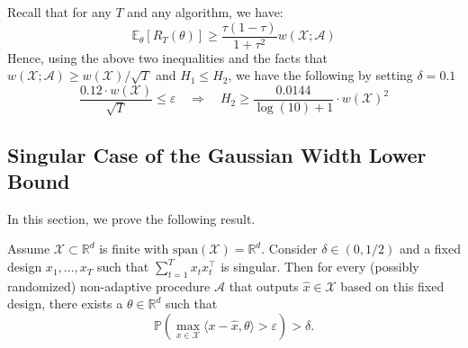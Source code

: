 Recall that for any $T$ and any algorithm, we have:
\[
\mathbb E_{\theta}[R_T(\theta)]\geq \frac{\tau(1-\tau)}{1+\tau^2} w(\mathcal{X};\mathcal{A})
\]
Hence, using the above two inequalities and the facts that $ w(\mathcal{X};\mathcal{A})\geq w(\mathcal{X})/\sqrt{T}$ and $H_1\leq H_2$, we have the following by setting $\delta=0.1$
\[
\frac{0.12 \cdot w(\mathcal{X})}{\sqrt{T}}\leq  \varepsilon \quad \Rightarrow \quad H_2\geq \frac{0.0144}{\log(10)+1} \cdot w(\mathcal{X})^2
\]
\subsection{Singular Case of the Gaussian Width Lower Bound}\label{appendix:singular-case-lower-bound}
In this section, we prove the following result.
\begin{theorem}
    Assume $\mathcal X\subset\mathbb R^d$ is finite with $\mathrm{span}(\mathcal X)=\mathbb R^d$.
Consider $\delta\in(0,1/2)$ and a fixed design $x_1,\dots,x_T $ such that $\sum_{t=1}^T x_tx_t^\top$ is singular. Then for every (possibly randomized) non-adaptive procedure $\mathcal A$ that outputs $\hat x\in\mathcal{X}$ based on this fixed design, there exists a $\theta\in \mathbb{R}^d$ such that
\[
\mathbb{P}(\max_{x\in\mathcal{X}}\langle x-\hat x,\theta\rangle> \varepsilon)>\delta.
\]
\end{theorem}
